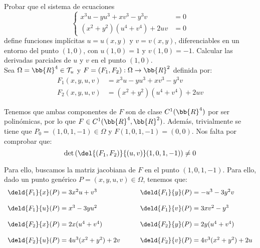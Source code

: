 \begin{ejercicio}
    Probar que el sistema de ecuaciones
    \begin{equation*}
        \left\{
            \begin{array}{ll}
                x^3u - yu^3 + xv^3 - y^3v &= 0 \\
                (x^2+y^2)(u^4+v^4) + 2uv &= 0
            \end{array}
        \right.
    \end{equation*}
    define funciones implícitas $u=u(x,y)$ y $v=v(x,y)$, diferenciables en un entorno
    del punto $(1,0)$, con $u(1,0)=1$ y $v(1,0)=-1$. Calcular las derivadas parciales de $u$ y $v$ en el punto $(1,0)$.\\

    Sea $\Omega = \bb{R}^4\in \mathcal{T}_u$ y $F=(F_1,F_2):\Omega \to \bb{R}^2$ definida por:
    \begin{align*}
        F_1(x,y,u,v) &= x^3u - yu^3 + xv^3 - y^3v \\
        F_2(x,y,u,v) &= (x^2+y^2)(u^4+v^4) + 2uv
    \end{align*}

    Tenemos que ambas componentes de $F$ son de clase $C^1(\bb{R}^4)$ por ser polinómicas,
    por lo que $F\in C^1(\bb{R}^4,\bb{R}^2)$.
    Además, trivialmente se tiene que $P_0=(1,0,1,-1)\in \Omega$ y $F(1,0,1,-1)=(0,0)$. Nos falta por comprobar que:
    \begin{equation*}
        \det \left( \del{(F_1,F_2)}{(u,v)}(1,0,1,-1) \right) \neq 0
    \end{equation*}

    Para ello, buscamos la matriz jacobiana de $F$ en el punto $(1,0,1,-1)$. Para ello, dado un punto genérico $P=(x,y,u,v)\in \Omega$, tenemos que:
    \begin{equation*}
        \begin{array}{ll}
            \deld{F_1}{x}(P) = 3x^2u + v^3 & \qquad \deld{F_1}{y}(P) = -u^3 - 3y^2v \\ \\
            \deld{F_1}{u}(P) = x^3 - 3yu^2 & \qquad \deld{F_1}{v}(P) = 3xv^2 - y^3 \\ \\
            \deld{F_2}{x}(P) = 2x(u^4+v^4) & \qquad \deld{F_2}{y}(P) = 2y(u^4+v^4) \\ \\
            \deld{F_2}{u}(P) = 4u^3(x^2+y^2) + 2v & \qquad \deld{F_2}{v}(P) = 4v^3(x^2+y^2) + 2u
        \end{array}
    \end{equation*}


\end{ejercicio}
